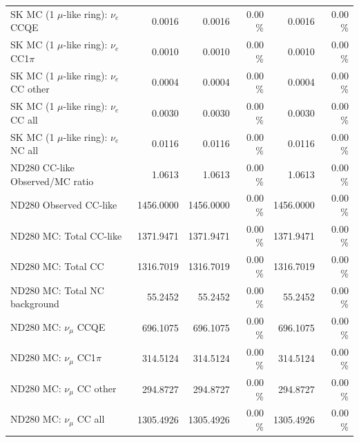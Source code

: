 \begin{table}
\begin{tabular}{| l | r | r  r | r  r |}
                             SK MC (1 $\mu$-like ring): $\nu_{e}$ CCQE &          0.0016 &          0.0016 &  0.00 \%  &          0.0016 &  0.00 \%  \\ 
                         SK MC (1 $\mu$-like ring): $\nu_{e}$ CC1$\pi$ &          0.0010 &          0.0010 &  0.00 \%  &          0.0010 &  0.00 \%  \\ 
                         SK MC (1 $\mu$-like ring): $\nu_{e}$ CC other &          0.0004 &          0.0004 &  0.00 \%  &          0.0004 &  0.00 \%  \\ 
                           SK MC (1 $\mu$-like ring): $\nu_{e}$ CC all &          0.0030 &          0.0030 &  0.00 \%  &          0.0030 &  0.00 \%  \\ 
                           SK MC (1 $\mu$-like ring): $\nu_{e}$ NC all &          0.0116 &          0.0116 &  0.00 \%  &          0.0116 &  0.00 \%  \\ 
\hline
                                       ND280 CC-like Observed/MC ratio &          1.0613 &          1.0613 &  0.00 \%  &          1.0613 &  0.00 \%  \\ 
                                                ND280 Observed CC-like &       1456.0000 &       1456.0000 &  0.00 \%  &       1456.0000 &  0.00 \%  \\ 
                                               ND280 MC: Total CC-like &       1371.9471 &       1371.9471 &  0.00 \%  &       1371.9471 &  0.00 \%  \\ 
                                                    ND280 MC: Total CC &       1316.7019 &       1316.7019 &  0.00 \%  &       1316.7019 &  0.00 \%  \\ 
                                         ND280 MC: Total NC background &         55.2452 &         55.2452 &  0.00 \%  &         55.2452 &  0.00 \%  \\ 
\hline
                                            ND280 MC: $\nu_{\mu}$ CCQE &        696.1075 &        696.1075 &  0.00 \%  &        696.1075 &  0.00 \%  \\ 
                                        ND280 MC: $\nu_{\mu}$ CC1$\pi$ &        314.5124 &        314.5124 &  0.00 \%  &        314.5124 &  0.00 \%  \\ 
                                        ND280 MC: $\nu_{\mu}$ CC other &        294.8727 &        294.8727 &  0.00 \%  &        294.8727 &  0.00 \%  \\ 
                                          ND280 MC: $\nu_{\mu}$ CC all &       1305.4926 &       1305.4926 &  0.00 \%  &       1305.4926 &  0.00 \%  \\ 

\end{tabular}
\end{table}
